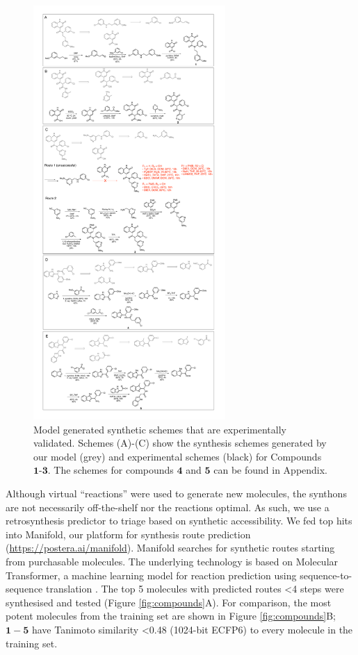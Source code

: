     
\begin{figure}
\centering
    \includegraphics[width=0.65\textwidth]{Chapters/Ranking/Figs/rxn_schemes_1_to_3.pdf}
    \caption{Model generated synthetic schemes that are experimentally validated. Schemes (A)-(C) show the synthesis schemes generated by our model (grey) and experimental schemes (black) for Compounds $\mathbf{1}$-$\mathbf{3}$. The schemes for compounds $\mathbf{4}$ and $\mathbf{5}$ can be found in Appendix.}
    \label{fig:synthesis_schemes}
\end{figure}

Although virtual ``reactions'' were used to generate new molecules, the synthons are not necessarily off-the-shelf nor the reactions optimal. As such, we use a retrosynthesis predictor to triage based on synthetic accessibility. We fed top hits into Manifold, our platform for synthesis route prediction (\url{https://postera.ai/manifold}). Manifold searches for synthetic routes starting from purchasable molecules. The underlying technology is based on Molecular Transformer, a machine learning model for reaction prediction using sequence-to-sequence translation \citep{yang2019molecular,schwaller2019molecular}. The top 5 molecules with predicted routes <4 steps were synthesised and tested (Figure \ref{fig:compounds}A). For comparison, the most potent molecules from the training set are shown in Figure \ref{fig:compounds}B; $\mathbf{1}-\mathbf{5}$ have Tanimoto similarity <0.48 (1024-bit ECFP6) to every molecule in the training set. 

